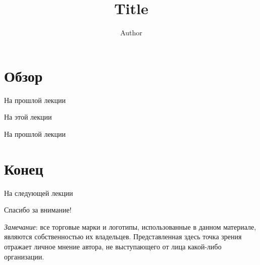 

\title{Title}
\author[Author]{Author}



\begin{frame}
\titlepage
\end{frame}

\section*{Обзор}

\begin{frame}{На прошлой лекции}
\end{frame}

\begin{frame}{На этой лекции}
\tableofcontents
\end{frame} 

\begin{frame}{На прошлой лекции}
\end{frame}


\section*{Конец}

\begin{frame}{На следующей лекции}
\end{frame}

\begin{frame}

{\huge{Спасибо за внимание!}\par}

\vfill

\tiny{\textit{Замечание}: все торговые марки и логотипы, использованные в данном материале, являются собственностью их владельцев. Представленная здесь точка зрения отражает личное мнение автора, не выступающего от лица какой-либо организации.}

\end{frame}


